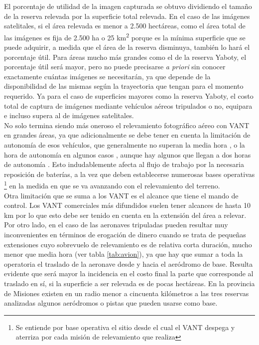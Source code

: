 El porcentaje de utilidad de la imagen capturada se obtuvo dividiendo el tamaño de la reserva relevada por la superficie total relevada. En el caso de las imágenes satelitales, si el área relevada es menor a 2.500 hectáreas, como el área total de las imágenes es fija de 2.500 ha o 25 km\textsuperscript{2} porque es la mínima superficie que se puede adquirir, a medida que el área de la reserva disminuya, también lo hará el porcentaje útil. Para áreas mucho más grandes como el de la reserva Yaboty, el porcentaje útil será mayor, pero no puede precisarse \textit{a priori} sin conocer exactamente cuántas imágenes se necesitarán, ya que depende de la disponibilidad de las mismas según la trayectoria que tengan para el momento requerido. Ya para el caso de superficies mayores como la reserva Yaboty, el costo total de captura de imágenes mediante vehículos aéreos tripulados o no, equipara e incluso supera al de imágenes satelitales. 
\\
No solo termina siendo más oneroso el relevamiento fotográfico aéreo con VANT en grandes áreas, ya que adicionalmente se debe tener en cuenta la limitación de autonomía de esos vehículos, que generalmente no superan la media hora \cite{noauthor_dji_nodate}, o la hora de autonomía en algunos casos \cite{noauthor_specs_nodate}, aunque hay algunos que llegan a dos horas de autonomía \cite{noauthor_us-1_nodate}. Esto indudablemente afecta al flujo de trabajo por la necesaria reposición de baterías, a la vez que deben establecerse numerosas bases operativas \footnote{Se entiende por base operativa el sitio desde el cual el VANT despega y aterriza por cada misión de relevamiento que realiza} en la medida en que se va avanzando con el relevamiento del terreno. \\
Otra limitación que se suma a los VANT es el alcance que tiene el mando de control. Los VANT comerciales más difundidos suelen tener alcances de hasta 10 km \cite{noauthor_dji_nodate} por lo que esto debe ser tenido en cuenta en la extensión del área a relevar. \\
Por otro lado, en el caso de las aeronaves tripuladas pueden resultar muy inconvenientes en términos de erogación de dinero cuando se trata de pequeñas extensiones cuyo sobrevuelo de relevamiento es de relativa corta duración, mucho menor que media hora (ver tabla \ref{tab:avion}), ya que hay que sumar a toda la operatoria el traslado de la aeronave desde y hacia el aeródromo de base. Resulta evidente que será mayor la incidencia en el costo final la parte que corresponde al traslado en sí, si la superficie a ser relevada es de pocas hectáreas. En la provincia de Misiones existen en un radio menor a cincuenta kilómetros a las tres reservas analizadas algunos aeródromos o pistas que pueden usarse como base.


